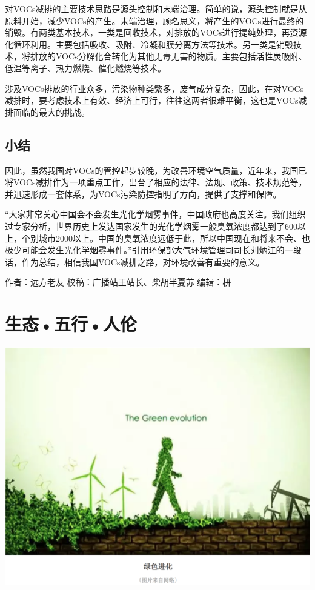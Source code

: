 \documentclass[
]{book}
\begin{document}
对VOCs减排的主要技术思路是源头控制和末端治理。简单的说，源头控制就是从原料开始，减少VOCs的产生。末端治理，顾名思义，将产生的VOCs进行最终的销毁。有两类基本技术，一类是回收技术，对排放的VOCs进行提纯处理，再资源化循环利用。主要包括吸收、吸附、冷凝和膜分离方法等技术。另一类是销毁技术，将排放的VOCs分解化合转化为其他无毒无害的物质。主要包括活性炭吸附、低温等离子、热力燃烧、催化燃烧等技术。

涉及VOCs排放的行业众多，污染物种类繁多，废气成分复杂，因此，在对VOCs减排时，要考虑技术上有效、经济上可行，往往这两者很难平衡，这也是VOCs减排面临的最大的挑战。

\hypertarget{ux5c0fux7ed3-1}{%
\subsection{小结}\label{ux5c0fux7ed3-1}}

因此，虽然我国对VOCs的管控起步较晚，为改善环境空气质量，近年来，我国已将VOCs减排作为一项重点工作，出台了相应的法律、法规、政策、技术规范等，并迅速形成一套体系，为VOCs污染防控指明了方向，提供了支撑和保障。

``大家非常关心中国会不会发生光化学烟雾事件，中国政府也高度关注。我们组织过专家分析，世界历史上发达国家发生的光化学烟雾一般臭氧浓度都达到了600以上，个别城市2000以上。中国的臭氧浓度远低于此，所以中国现在和将来不会、也极少可能会发生光化学烟雾事件。''引用环保部大气环境管理司司长刘炳江的一段话，作为总结，相信我国VOCs减排之路，对环境改善有重要的意义。

作者：远方老友
校稿：广播站王站长、柴胡半夏苏
编辑：栟

\hypertarget{ux751fux6001ux4e94ux884cux4ebaux4f26}{%
\section{生态•五行•人伦}\label{ux751fux6001ux4e94ux884cux4ebaux4f26}}

\includegraphics[width=8.33in]{images/swr1}
\end{document}
